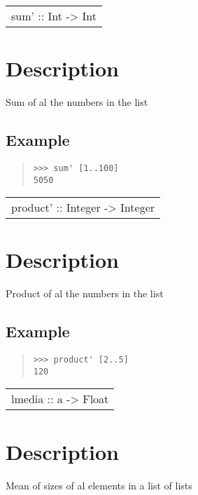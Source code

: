 \begin{haddockdesc}
\item[\begin{tabular}{@{}l}
sum' :: {\char 91}Int{\char 93} -> Int
\end{tabular}]
{\haddockbegindoc
\section*{Description}
Sum of al the numbers in the list\par
\subsection*{Example}
\begin{quote}
{\haddockverb\begin{verbatim}
>>> sum' [1..100]
5050

\end{verbatim}}
\end{quote}}
\end{haddockdesc}
\begin{haddockdesc}
\item[\begin{tabular}{@{}l}
product' :: {\char 91}Integer{\char 93} -> Integer
\end{tabular}]
{\haddockbegindoc
\section*{Description}
Product of al the numbers in the list\par
\subsection*{Example}
\begin{quote}
{\haddockverb\begin{verbatim}
>>> product' [2..5]
120

\end{verbatim}}
\end{quote}}
\end{haddockdesc}
\begin{haddockdesc}
\item[\begin{tabular}{@{}l}
lmedia :: {\char 91}{\char 91}{\char 91}a{\char 93}{\char 93}{\char 93} -> Float
\end{tabular}]
{\haddockbegindoc
\section*{Description}
Mean of sizes of al elements in a list of lists\par}
\end{haddockdesc}
